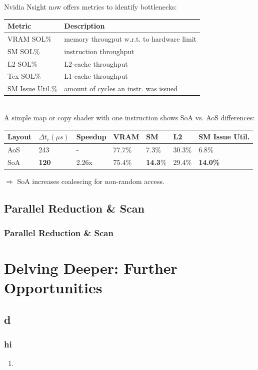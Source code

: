 \documentclass{beamer}
\let\oldcite=\cite
\renewcommand{\cite}[1]{\textcolor[rgb]{.55,.55,.89}{\oldcite{#1}}}
\begin{document}
\begin{frame}
Nvidia Nsight\cite{NVIDIA:METRICS} now offers metrics to identify bottlenecks:
\vspace{-5}
\begin{table}
  \footnotesize
  \begin{tabular}{ | l | l |}    \hline
    \textbf{Metric}   & \textbf{Description} \\ \hline
    VRAM SOL\%        & memory througput w.r.t. to hardware limit\\\hline
    SM SOL\%          & instruction throughput\\\hline
    L2 SOL\%          & L2-cache throughput\\\hline
    Tex SOL\%         & L1-cache throughput\\\hline
    SM Issue Util.\%  & amount of cycles an instr. was issued\\\hline
  \end{tabular}
\end{table}
\\
\vspace{5}
A simple map or copy shader with one instruction shows SoA vs. AoS differences:
\vspace{-15}
\begin{table}
  \footnotesize
  \begin{tabular}{ | l | l | l | l | l | l | l |}    \hline
    Layout &  $\Delta t_c (\mu s)$	& Speedup &VRAM     & SM     & L2     & SM Issue Util. \\\hline
    AoS         & 243                   & -       &77.7\%   & 7.3\%  & 30.3\% & 6.8\% \\\hline
    SoA         & \textbf{120}                   & 2.26x   &75.4\%   & \textbf{14.3}\% & 29.4\% & \textbf{14.0\%} \\
    \hline
\end{tabular}
\end{table}
$\Rightarrow$ SoA increases coalescing for non-random access.
\end{frame}
\subsection{Parallel Reduction \& Scan}
\begin{frame}
  \frametitle{Parallel Reduction \& Scan}
\end{frame}
\section{Delving Deeper: Further Opportunities}

\subsection{d}

\begin{frame}
\frametitle{hi}
  \begin{enumerate}
    \item \cite{MPM:COURSE}
  \end{enumerate}
\end{frame}

\printbibliography
\end{document}

